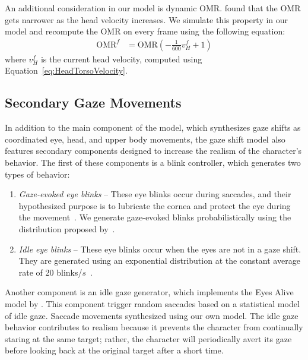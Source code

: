An additional consideration in our model is dynamic OMR. \citet{guitton1987gaze} found that the OMR gets narrower as the head velocity increases. We simulate this property in our model and recompute the OMR on every frame using the following equation:
%
\begin{align} \label{eq:OMRUpdate}
\mathrm{OMR}^f &= \mathrm{OMR} (-\frac{1}{600} v^f_H + 1)
\end{align}
%
where $v^f_H$ is the current head velocity, computed using Equation~\ref{eq:HeadTorsoVelocity}.

\subsection{Secondary Gaze Movements}
\label{sec:GazeShiftSecondary}

In addition to the main component of the model, which synthesizes gaze shifts as coordinated eye, head, and upper body movements, the gaze shift model also features secondary components designed to increase the realism of the character's behavior. The first of these components is a blink controller, which generates two types of behavior:

\begin{enumerate}
\item \emph{Gaze-evoked eye blinks} -- These eye blinks occur during saccades, and their hypothesized purpose is to lubricate the cornea and protect the eye during the movement~\citep{evinger1994lookleap}. We generate gaze-evoked blinks probabilistically using the distribution proposed by~\citet{peters2010animating}.
\item \emph{Idle eye blinks} -- These eye blinks occur when the eyes are not in a gaze shift. They are generated using an exponential distribution at the constant average rate of 20 blinks/$s$~\citep{bentivoglio1997blinkrate}.
\end{enumerate}

Another component is an idle gaze generator, which implements the Eyes Alive model by \citet{lee2002eyes}. This component trigger random saccades based on a statistical model of idle gaze. Saccade movements synthesized using our own model. The idle gaze behavior contributes to realism because it prevents the character from continually staring at the same target; rather, the character will periodically avert its gaze before looking back at the original target after a short time. 